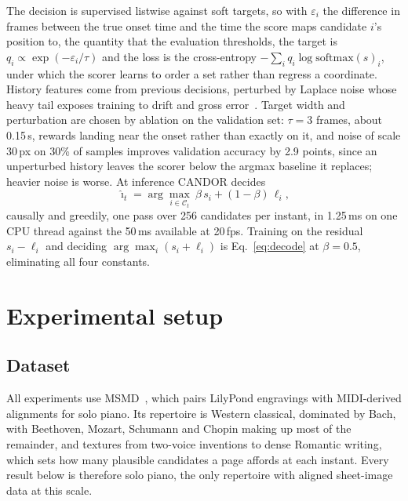 \documentclass{article}
\newcommand{\sys}{CANDOR}
\begin{document}
The decision is supervised listwise against soft targets, so with
$\varepsilon_i$ the difference in frames between the true onset time and the
time the score maps candidate $i$'s position to, the quantity that the
evaluation thresholds, the target is
$q_i\propto\exp(-\varepsilon_i/\tau)$ and the loss is the cross-entropy
$-\sum_i q_i\log\mathrm{softmax}(s)_i$, under which the scorer learns to order
a set rather than regress a coordinate. History features come from previous
decisions, perturbed by Laplace noise whose heavy tail exposes training to
drift and gross error~\cite{bengio2015scheduled}. Target width and perturbation
are chosen by ablation on the validation set: $\tau=3$ frames, about 0.15\,s,
rewards landing near the onset rather than exactly on it, and noise of scale
30\,px on 30\% of samples improves validation accuracy by 2.9 points, since an
unperturbed history leaves the scorer below the argmax baseline it replaces;
heavier noise is worse. At inference \sys{} decides
\begin{equation}
  \hat{\imath}_t=\arg\max_{i\in\mathcal{C}_t}\ \beta\,s_i+(1-\beta)\,\ell_i ,
  \label{eq:decode}
\end{equation}
causally and greedily, one pass over 256 candidates per instant, in 1.25\,ms on
one CPU thread against the 50\,ms available at 20\,fps. Training on the
residual $s_i-\ell_i$ and deciding $\arg\max_i(s_i+\ell_i)$ is Eq.~\ref{eq:decode} at
$\beta=0.5$, eliminating all four constants.

\section{Experimental setup}
\label{sec:setup}

\subsection{Dataset}

All experiments use MSMD~\cite{dorfer2018msmd}, which pairs
LilyPond engravings with MIDI-derived alignments for solo piano. Its repertoire
is Western classical, dominated by Bach, with Beethoven, Mozart, Schumann and
Chopin making up most of the remainder, and textures from two-voice
inventions to dense Romantic writing, which sets how many plausible candidates
a page affords at each instant. Every result below is therefore solo piano,
the only repertoire with aligned sheet-image data at this scale.
\end{document}
